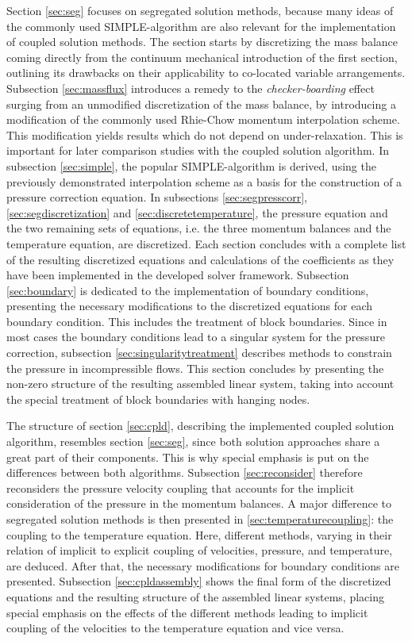 Section \ref{sec:seg} focuses on segregated solution methods, because many ideas of the commonly used SIMPLE-algorithm are also relevant for the implementation of coupled solution methods. The section starts by discretizing the mass balance coming directly from the continuum mechanical introduction of the first section, outlining its drawbacks on their applicability to co-located variable arrangements. Subsection \ref{sec:massflux} introduces a remedy to the \emph{checker-boarding} effect surging from an unmodified discretization of the mass balance, by introducing a modification of the commonly used Rhie-Chow \cite{rhie82} momentum interpolation scheme. This modification yields results which do not depend on under-relaxation. This is important for later comparison studies with the coupled solution algorithm. In subsection \ref{sec:simple}, the popular SIMPLE-algorithm is derived, using the previously demonstrated interpolation scheme as a basis for the construction of a pressure correction equation. In subsections \ref{sec:segpresscorr}, \ref{sec:segdiscretization} and \ref{sec:discretetemperature}, the pressure equation and the two remaining sets of equations, i.e. the three momentum balances and the temperature equation, are discretized. Each section concludes with a complete list of the resulting discretized equations and calculations of the coefficients as they have been implemented in the developed solver framework. Subsection \ref{sec:boundary} is dedicated to the implementation of boundary conditions, presenting the necessary modifications to the discretized equations for each boundary condition. This includes the treatment of block boundaries. Since in most cases the boundary conditions lead to a singular system for the pressure correction, subsection \ref{sec:singularitytreatment} describes methods to constrain the pressure in incompressible flows. This section concludes by presenting the non-zero structure of the resulting assembled linear system, taking into account the special treatment of block boundaries with hanging nodes.

The structure of section \ref{sec:cpld}, describing the implemented coupled solution algorithm, resembles section \ref{sec:seg}, since both solution approaches share a great part of their components. This is why special emphasis is put on the differences between both algorithms. Subsection \ref{sec:reconsider} therefore reconsiders the pressure velocity coupling that accounts for the implicit consideration of the pressure in the momentum balances. A major difference to segregated solution methods is then presented in \ref{sec:temperaturecoupling}: the coupling to the temperature equation. Here, different methods, varying in their relation of implicit to explicit coupling of velocities, pressure, and temperature, are deduced. After that, the necessary modifications for boundary conditions are presented. Subsection \ref{sec:cpldassembly} shows the final form of the discretized equations and the resulting structure of the assembled linear systems, placing special emphasis on the effects of the different methods leading to implicit coupling of the velocities to the temperature equation and vice versa.

